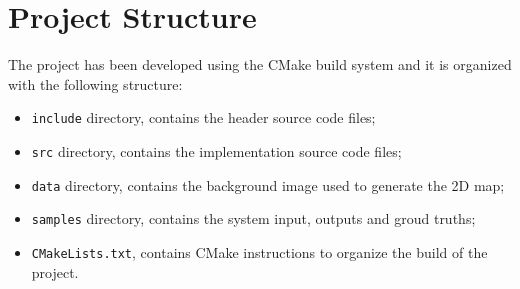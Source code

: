 \section{Project Structure}


The project has been developed using the CMake build system and it is organized with the
following structure:
\begin{itemize}
    \item \verb|include| directory, contains the header source code files;
    \item \verb|src| directory, contains the implementation source code files;
    \item \verb|data| directory, contains the background image used to generate the 2D map;
    \item \verb|samples| directory, contains the system input, outputs and groud truths;
    \item \verb|CMakeLists.txt|, contains CMake instructions to organize the build of the project. 
\end{itemize}